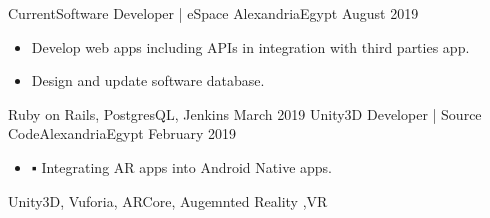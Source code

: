 %
%
%
\begin{experiences}
  \experience
    {Current}{Software Developer | eSpace }{Alexandria}{Egypt}
    {August 2019}   {
                      \begin{itemize}
                        \item Develop web apps including APIs in integration with third parties app.
                        \item Design and update software database.
                      \end{itemize}
                    }
                    {Ruby on Rails, PostgresQL, Jenkins}                    
  \emptySeparator
  \experience
    {March 2019	} {Unity3D Developer  | Source Code}{Alexandria}{Egypt}
    {February 2019	}    {
                      \begin{itemize}
                        \item ▪	Integrating AR apps into Android Native apps.                          
                      \end{itemize}
                    }
                    {Unity3D, Vuforia, ARCore, Augemnted Reality ,VR}
\end{experiences}
